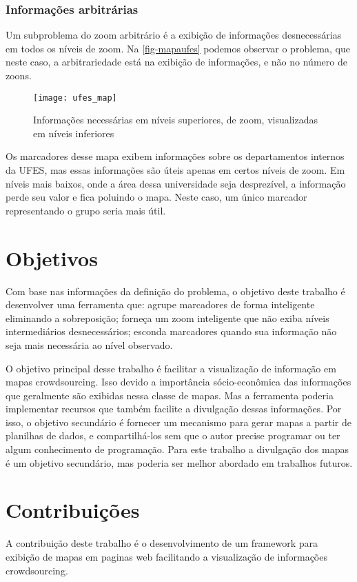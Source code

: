 \subsubsection{Informações arbitrárias}
Um subproblema do zoom arbitrário é a exibição de informações desnecessárias em todos os níveis de zoom. Na \autoref{fig-mapaufes} podemos observar o problema, que neste caso, a arbitrariedade está na exibição de informações, e não no número de zoons. 
 \begin{figure}[htb]
	\caption{\label{fig-mapaufes}Informações necessárias em níveis superiores, de zoom, visualizadas em níveis inferiores}
	\begin{center}
	    \texttt{[image: ufes\_map]}
	\end{center}
\end{figure}
Os marcadores desse mapa exibem informações sobre os departamentos internos da UFES, mas essas informações são úteis apenas em certos níveis de zoom. Em níveis mais baixos, onde a área dessa universidade seja desprezível, a informação perde seu valor e fica poluindo o mapa. Neste caso, um único marcador representando o grupo seria mais útil.

\section{Objetivos}
Com base nas informações da definição do problema, o objetivo deste trabalho é desenvolver uma ferramenta que: agrupe marcadores de forma inteligente eliminando a sobreposição; forneça um zoom inteligente que não exiba níveis intermediários desnecessários; esconda marcadores quando sua informação não seja mais necessária ao nível observado.

O objetivo principal desse trabalho é facilitar a visualização de informação em mapas crowdsourcing. Isso devido a importância sócio-econômica das informações que geralmente são exibidas nessa classe de mapas. Mas a ferramenta poderia implementar recursos que também facilite a divulgação dessas informações. Por isso, o objetivo secundário é fornecer um mecanismo para gerar mapas a partir de planilhas de dados, e compartilhá-los sem que o autor precise programar ou ter algum conhecimento de programação. Para este trabalho a divulgação dos mapas é um objetivo secundário, mas poderia ser melhor abordado em trabalhos futuros.
  
\section{Contribuições}
A contribuição deste trabalho é o desenvolvimento de um framework para exibição de mapas em paginas web facilitando a visualização de informações crowdsourcing.

